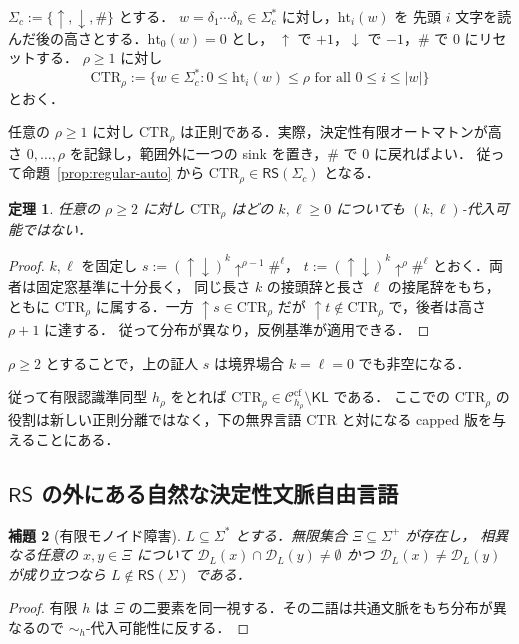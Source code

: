 \documentclass[11pt,a4paper]{ltjsarticle}
\newtheorem{theorem}{定理}[section]
\newtheorem{lemma}[theorem]{補題}
\theoremstyle{remark}
\theoremstyle{plain}
\newcommand{\D}{\mathcal{D}}
\newcommand{\cf}{\mathrm{cf}}
\newcommand{\Ccf}[1]{\mathcal C_{#1}^{\cf}}
\begin{document}
$\Sigma_c:=\{\uparrow,\downarrow,\#\}$ とする．
$w=\delta_1\cdots\delta_n\in\Sigma_c^*$ に対し，$\mathrm{ht}_i(w)$ を
先頭 $i$ 文字を読んだ後の高さとする．$\mathrm{ht}_0(w)=0$ とし，
$\uparrow$ で $+1$，$\downarrow$ で $-1$，$\#$ で $0$ にリセットする．
$\rho\ge1$ に対し
\[
\mathrm{CTR}_\rho:=
\{w\in\Sigma_c^*:0\le\mathrm{ht}_i(w)\le\rho
\text{ for all }0\le i\le|w|\}
\]
とおく．

任意の $\rho\ge1$ に対し $\mathrm{CTR}_\rho$ は正則である．実際，決定性有限オートマトンが高さ
$0,\ldots,\rho$ を記録し，範囲外に一つの sink を置き，$\#$ で $0$ に戻ればよい．
従って命題~\ref{prop:regular-auto} から
$\mathrm{CTR}_\rho\in\mathsf{RS}(\Sigma_c)$ となる．

\begin{theorem}\label{thm:ctr-non-kl}
任意の $\rho\ge2$ に対し $\mathrm{CTR}_\rho$ はどの $k,\ell\ge0$ についても
$(k,\ell)$-代入可能ではない．
\end{theorem}
\begin{proof}
$k,\ell$ を固定し
$s:=(\uparrow\downarrow)^k\uparrow^{\rho-1}\#^\ell$，
$t:=(\uparrow\downarrow)^k\uparrow^\rho\#^\ell$ とおく．両者は固定窓基準に十分長く，
同じ長さ $k$ の接頭辞と長さ $\ell$ の接尾辞をもち，ともに
$\mathrm{CTR}_\rho$ に属する．一方
$\uparrow s\in\mathrm{CTR}_\rho$ だが
$\uparrow t\notin\mathrm{CTR}_\rho$ で，後者は高さ $\rho+1$ に達する．
従って分布が異なり，反例基準が適用できる．
\end{proof}

$\rho\ge2$ とすることで，上の証人 $s$ は境界場合 $k=\ell=0$ でも非空になる．

従って有限認識準同型 $h_\rho$ をとれば
$\mathrm{CTR}_\rho\in\Ccf{h_\rho}\setminus\mathsf{KL}$ である．
ここでの $\mathrm{CTR}_\rho$ の役割は新しい正則分離ではなく，下の無界言語
$\mathrm{CTR}$ と対になる capped 版を与えることにある．

\subsection{\texorpdfstring{$\mathsf{RS}$}{RS} の外にある自然な決定性文脈自由言語}

\begin{lemma}[有限モノイド障害]\label{lem:finite-monoid-obstruction}
$L\subseteq\Sigma^*$ とする．無限集合 $\Xi\subseteq\Sigma^+$ が存在し，
相異なる任意の $x,y\in\Xi$ について
$\D_L(x)\cap\D_L(y)\ne\emptyset$ かつ $\D_L(x)\ne\D_L(y)$ が成り立つなら
$L\notin\mathsf{RS}(\Sigma)$ である．
\end{lemma}
\begin{proof}
有限 $h$ は $\Xi$ の二要素を同一視する．その二語は共通文脈をもち分布が異なるので
$\sim_h$-代入可能性に反する．
\end{proof}
\end{document}
